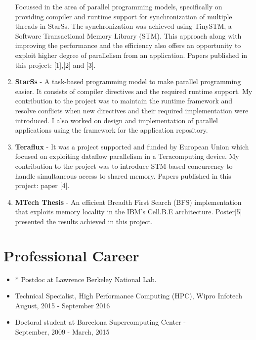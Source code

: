 \documentclass[margin]{res}
\begin{document}
\begin{resume}
\begin{enumerate}
			 Focussed in the area of parallel programming models, specifically on providing compiler and runtime support for synchronization of multiple threads in StarSs.
			 The synchronization was achieved using TinySTM, a Software Transactional Memory Library (STM).
			 This approach along with improving the performance and the efficiency also offers an opportunity to exploit higher degree of parallelism from an application.
			 Papers published in this project: [1],[2] and [3].
%
	   \item {\bf StarSs} -
			 A task-based programming model to make parallel programming easier. It consists of compiler directives and the required runtime support.
			 My contribution to the project was to maintain the runtime framework and resolve conflicts when new directives and their required implementation were introduced.
			 I also worked on design and implementation of parallel applications using the framework for the application repository.
%
	   \item {\bf Teraflux} -
			 It was a project supported and funded by European Union which focused on exploiting dataflow parallelism in a Teracomputing device.
 	    		My contribution to the project was to introduce STM-based concurrency to handle simultaneous access to shared memory.
	     	Papers published in this project: paper [4].
%
	   \item {\bf MTech Thesis} -
		An efficient Breadth First Search (BFS) implementation that exploits memory locality in the IBM's Cell.B.E architecture.
		Poster[5] presented the results achieved in this project.
%
\end{enumerate}
%
\section{Professional Career}
%
\begin{itemize}
    \item * Postdoc at Lawrence Berkeley National Lab.  \\
	   \item Technical Specialist, High Performance Computing (HPC), Wipro Infotech \\
			 August, 2015 - September 2016
	   \item Doctoral student at Barcelona Supercomputing Center - \\
			 September, 2009 - March, 2015
\end{itemize}
%

\end{resume}
\end{document}
